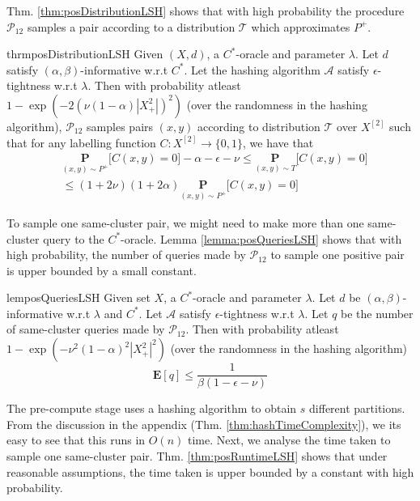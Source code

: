 \documentclass[12pt]{article}
\newcommand{\mb}{\mathbf}
\newcommand{\mc}{\mathcal}
\begin{document}
Thm. \ref{thm:posDistributionLSH} shows that with high probability the procedure $\mc P_{12}$ samples a pair according to a distribution $\mc T$  which approximates $P^+$. 
\begin{restatable}{thrm}{posDistributionLSH}
\label{thm:posDistributionLSH}
Given $(X, d)$, a $C^*$-oracle and parameter $\lambda$. Let $d$ satisfy $(\alpha, \beta)$-informative  w.r.t $C^*$. Let the hashing algorithm $\mc A$ satisfy $\epsilon$-tightness w.r.t $\lambda$. Then with probability atleast $1-\exp(-2(\nu(1-\alpha)|X^2_+|)^2)$ (over the randomness in the hashing algorithm), $\mc P_{12}$ samples pairs $(x, y)$  according to distribution $\mc T$ over $X^{[2]}$ such that for any labelling function $C : X^{[2]} \rightarrow \{0, 1\}$, we have that 
\begin{align*}
  &\underset{(x, y) \sim P^+}{\mb P} \big[ C(x, y) = 0 ] -\alpha -\epsilon -\nu \le \underset{(x, y) \sim T}{\mb P} \big[ C(x, y) = 0 ] \\
  &\le  (1 + 2\nu)(1+2\alpha) \underset{(x, y) \sim P^+}{\mb P} \big[ C(x, y) = 0 ]
\end{align*} 
\end{restatable}

To sample one same-cluster pair, we might need to make more than one same-cluster query to the $C^*$-oracle. Lemma \ref{lemma:posQueriesLSH} shows that with high probability, the number of queries made by $\mc P_{12}$ to sample one positive pair is upper bounded by a small constant. 

\begin{restatable}{lem}{posQueriesLSH}
\label{lemma:posQueriesLSH}
Given set $X$, a $C^*$-oracle and parameter $\lambda$. Let $d$ be $(\alpha, \beta)$-informative w.r.t $\lambda$ and $C^*$. Let $\mc A$ satisfy $\epsilon$-tightness w.r.t $\lambda$. Let $q$ be the number of same-cluster queries made by $\mc P_{12}$. Then with probability atleast $1-\exp(-\nu^2(1-\alpha)^2|X^2_+|^2)$ (over the randomness in the hashing algorithm) $$\mb E[q] \le \frac{1}{\beta(1-\epsilon-\nu)}$$ 
\end{restatable}

The pre-compute stage uses a hashing algorithm to obtain $s$ different partitions. From the discussion in the appendix (Thm. \ref{thm:hashTimeComplexity}), we its easy to see that this runs in $O(n)$ time. Next, we  analyse the time taken to sample one same-cluster pair.  Thm. \ref{thm:posRuntimeLSH} shows that under reasonable assumptions, the time taken is upper bounded by a constant with high probability. 
\end{document}
